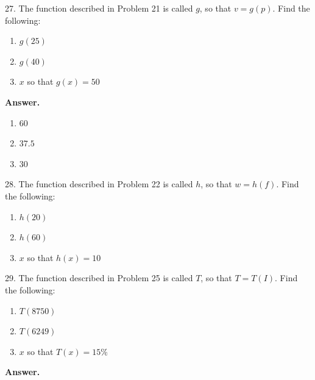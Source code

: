 \documentclass[10pt,]{book}
\theoremstyle{plain}
\theoremstyle{definition}
\theoremstyle{definition}
\theoremstyle{definition}
\begin{document}
\begin{exerciselist}
\item[27.]\hypertarget{exercise-37}{}The function described in Problem 21 is called \(g\), so that \(v = g( p)\). Find the following: \leavevmode%
\begin{enumerate}[label=\alph*]
\item\hypertarget{li-82}{}\(g(25)\)%
\item\hypertarget{li-83}{}\(g(40)\)%
\item\hypertarget{li-84}{}\(x\) so that \(g(x) = 50\)%
\end{enumerate}
%
\par\smallskip
\par\smallskip
\noindent\textbf{Answer.}\hypertarget{answer-24}{}\quad
\leavevmode%
\begin{enumerate}[label=\alph*]
\item\hypertarget{li-85}{}\(60\)%
\item\hypertarget{li-86}{}\(37.5\)%
\item\hypertarget{li-87}{}\(30\)%
\end{enumerate}
%
\item[28.]\hypertarget{exercise-38}{}The function described in Problem 22 is called \(h\), so that \(w = h( f)\). Find the following: \leavevmode%
\begin{enumerate}[label=\alph*]
\item\hypertarget{li-88}{}\(h(20)\)%
\item\hypertarget{li-89}{}\(h(60)\)%
\item\hypertarget{li-90}{}\(x\) so that \(h(x) = 10\)%
\end{enumerate}
%
\par\smallskip
\item[29.]\hypertarget{exercise-39}{}The function described in Problem 25 is called \(T\), so that \(T = T( I)\). Find the following: \leavevmode%
\begin{enumerate}[label=\alph*]
\item\hypertarget{li-91}{}\(T(8750)\)%
\item\hypertarget{li-92}{}\(T(6249)\)%
\item\hypertarget{li-93}{}\(x\) so that \(T(x) = 15\%\)%
\end{enumerate}
%
\par\smallskip
\par\smallskip
\noindent\textbf{Answer.}\hypertarget{answer-25}{}\quad
\leavevmode%
\begin{enumerate}[label=\alph*]

\end{enumerate}
\end{exerciselist}
\end{document}
